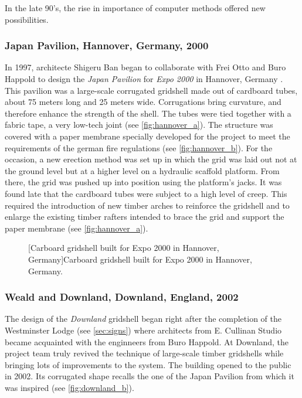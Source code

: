 In the late 90's, the rise in importance of computer methods offered new possibilities.

\subsubsection{Japan Pavilion, Hannover, Germany, 2000}
In 1997, architecte Shigeru Ban began to collaborate with Frei Otto and Buro Happold to design the \emph{Japan Pavilion} for \emph{Expo 2000} in Hannover, Germany \cite{Ban2006}. This pavilion was a large-scale corrugated gridshell made out of cardboard tubes, about 75 meters long and 25 meters wide. Corrugations bring curvature, and therefore enhance the strength of the shell. The tubes were tied together with a fabric tape, a very low-tech joint (see \cref{fig:hannover_a}). The structure was covered with a paper membrane specially developed for the project to meet the requirements of the german fire regulations (see \cref{fig:hannover_b}). For the occasion, a new erection method was set up in which the grid was laid out not at the ground level but at a higher level on a hydraulic scaffold platform. From there, the grid was pushed up into position using the platform's jacks. It was found late that the cardboard tubes were subject to a high level of creep. This required the introduction of new timber arches to reinforce the gridshell and to enlarge the existing timber rafters intended to brace the grid and support the paper membrane (see \cref{fig:hannover_a}).
\begin{figure}[t]
		\hspace*{\fill}
		\vspace{10pt}
		[Carboard gridshell built for Expo 2000 in Hannover, Germany]{Carboard gridshell built for Expo 2000 in Hannover, Germany.}
		\label{fig:hannover}    
\end{figure}

\subsubsection{Weald and Downland, Downland, England, 2002}
The design of the \emph{Downland} gridshell began right after the completion of the Westminster Lodge (see \cref{sec:signs}) where architects from E. Cullinan Studio became acquainted with the enginneers from Buro Happold. At Downland, the project team truly revived the technique of large-scale timber gridshells while bringing lots of improvements to the system. The building opened to the public in 2002. Its corrugated shape recalls the one of the Japan Pavilion from which it was inspired (see \cref{fig:downland_b}).

